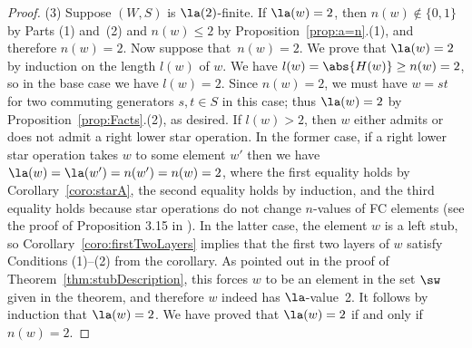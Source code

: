 \begin{remark}
\begin{proof}
(3) Suppose $(W,S)$ is $\la(2)$-finite. If $\la(w)=2$, then $n(w)\notin\{0,1\}$ by Parts (1) and~(2)
and $n(w)\le 2$ by Proposition~\ref{prop:a=n}.(1), and therefore $n(w)=2$. Now suppose that~$n(w)=2$. We prove that
$\la(w)=2$ by induction on the length $l(w)$ of $w$. We have $l(w)= \abs{H(w)}\ge n(w)=2$, so in the
base case we have $l(w)=2$. Since $n(w)=2$, we must have $w=st$ for two commuting generators $s,t\in
S$ in this case; thus $\la(w)=2$ by Proposition~\ref{prop:Facts}.(2), as desired.  If $l(w)>2$, then $w$
either admits or does not admit a right lower star operation. In the former case, if a right lower
star operation takes $w$ to some element $w'$ then we have $\la(w)=\la(w')=n(w')=n(w)=2$, where the
first equality holds by Corollary~\ref{coro:starA}, the second equality holds by induction, and the third
equality holds because star operations do not change $n$-values of FC elements (see the proof of
Proposition 3.15 in \cite{GreenXu}). In the latter case, the element $w$ is a left stub, so
Corollary~\ref{coro:firstTwoLayers} implies that the first two layers of $w$ satisfy Conditions (1)--(2) from
the corollary. As pointed out in the proof of Theorem~\ref{thm:stubDescription}, this forces $w$ to be an
element in the set $\sw$ given in the theorem, and therefore $w$ indeed has $\la$-value~2.  It
follows by induction that $\la(w)=2$. We have proved that $\la(w)=2$ if and only if~$n(w)=2$.
\end{proof}
    \end{remark}

